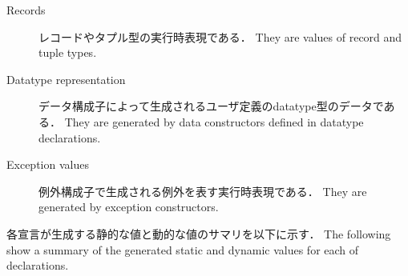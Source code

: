 \documentclass{jbook}
\newcommand{\txt}[2]{#2}
\begin{document}
\begin{description}
\item[\txt{レコード}{Records}]
\ifjp%
	レコードやタプル型の実行時表現である．
\else%
	They are values of record and tuple types.
\fi%
\item[\txt{データ型表現}{Datatype representation}]
\ifjp%
	データ構成子によって生成されるユーザ定義のdatatype型のデータである．
\else%
	They are generated by data constructors defined in datatype declarations.
\fi%
\item[\txt{例外データ}{Exception values}]
\ifjp%
	例外構成子で生成される例外を表す実行時表現である．
\else%
	They are generated by exception constructors.
\fi%
\end{description}

\ifjp%
	各宣言が生成する静的な値と動的な値のサマリを以下に示す．
\else%
	The following show a summary of the generated static and dynamic
values for each of declarations.
\fi%
\end{document}
